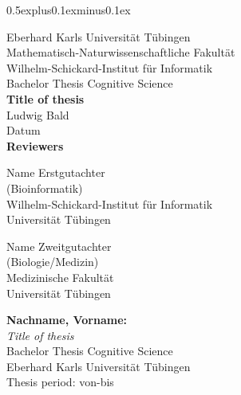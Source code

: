 \begin{titlepage}
	\textwidth 14cm
	\textheight 22cm
	\topmargin 0.0cm
	\evensidemargin 1cm
	\oddsidemargin 1cm
	\parskip0.5explus0.1exminus0.1ex
	
	\begin{center}
		{\LARGE Eberhard Karls Universit\"at T\"ubingen}\\
		{\large Mathematisch-Naturwissenschaftliche Fakult\"at \\
			Wilhelm-Schickard-Institut f\"ur Informatik\\[3cm]}
		{\huge Bachelor Thesis Cognitive Science\\[2cm]}
		{\Large\bf  Title of thesis\\[1.5cm]}
		{\large Ludwig Bald}\\[0.5cm]
		Datum\\[3cm]
		{\small\bf Reviewers}\\[0.5cm]
		\parbox{7cm}{\begin{center}{\large Name Erstgutachter}\\
				(Bioinformatik)\\
				{\footnotesize Wilhelm-Schickard-Institut f\"ur Informatik\\
					Universit\"at T\"ubingen}\end{center}}\hfill\parbox{4cm}{\begin{center}
				{\large Name Zweitgutachter}\\
				(Biologie/Medizin)\\
				{\footnotesize Medizinische Fakult\"at\\
					Universit\"at T\"ubingen}\end{center}
		}
	\end{center}
\end{titlepage}


\thispagestyle{empty}
\vspace*{\fill}
\begin{minipage}{11.2cm}
	\textbf{Nachname, Vorname:}\\
	\emph{Title of thesis}\\ Bachelor Thesis Cognitive Science\\
	Eberhard Karls Universit\"at T\"ubingen\\
	Thesis period: von-bis
\end{minipage}
\newpage




